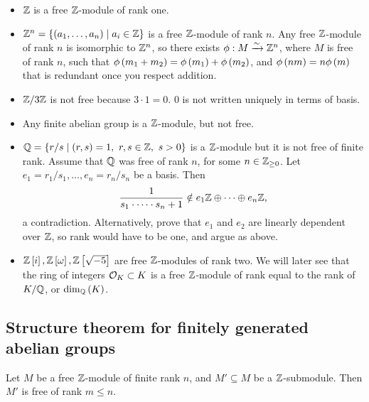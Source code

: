 \begin{example*}
\hfill
\begin{itemize}
\item $ \mathbb{Z} $ is a free $ \mathbb{Z} $-module of rank one.
\item $ \mathbb{Z}^n = \left\{ \left( a_1, \dots, a_n \right) \mid a_i \in \mathbb{Z} \right\} $ is a free $ \mathbb{Z} $-module of rank $ n $. Any free $ \mathbb{Z} $-module of rank $ n $ is isomorphic to $ \mathbb{Z}^n $, so there exists $ \phi : M \xrightarrow{\sim} \mathbb{Z}^n $, where $ M $ is free of rank $ n $, such that $ \phi\left( m_1 + m_2 \right) = \phi\left( m_1 \right) + \phi\left( m_2 \right) $, and $ \phi\left( nm \right) = n\phi\left( m \right) $ that is redundant once you respect addition.
\item $ \mathbb{Z} / 3\mathbb{Z} $ is not free because $ 3 \cdot 1 = 0 $. $ 0 $ is not written uniquely in terms of basis.
\item Any finite abelian group is a $ \mathbb{Z} $-module, but not free.
\item $ \Q = \cb{r / s \mid \rb{r, s} = 1, \ r, s \in \Z, \ s > 0} $ is a $ \mathbb{Z} $-module but it is not free of finite rank. Assume that $ \mathbb{Q} $ was free of rank $ n $, for some $ n \in \mathbb{Z}_{\ge 0} $. Let $ e_1 = r_1 / s_1, \dots, e_n = r_n / s_n $ be a basis. Then
$$ \dfrac{1}{s_1 \cdot \dots \cdot s_n + 1} \notin e_1\mathbb{Z} \oplus \dots \oplus e_n\mathbb{Z}, $$
a contradiction. Alternatively, prove that $ e_1 $ and $ e_2 $ are linearly dependent over $ \mathbb{Z} $, so rank would have to be one, and argue as above.
\item $ \mathbb{Z}\left[ i \right], \mathbb{Z}\left[ \omega \right], \mathbb{Z}\left[ \sqrt{-5} \right] $ are free $ \mathbb{Z} $-modules of rank two. We will later see that the ring of integers $ \mathcal{O}_K \subset K $ is a free $ \mathbb{Z} $-module of rank equal to the rank of $ K / \mathbb{Q} $, or $ \dim_{\mathbb{Q}}\left( K \right) $.
\end{itemize}
\end{example*}

\pagebreak

\subsection{Structure theorem for finitely generated abelian groups}

\begin{theorem}
Let $ M $ be a free $ \mathbb{Z} $-module of finite rank $ n $, and $ M' \subseteq M $ be a $ \mathbb{Z} $-submodule. Then $ M' $ is free of rank $ m \le n $.
\end{theorem}

